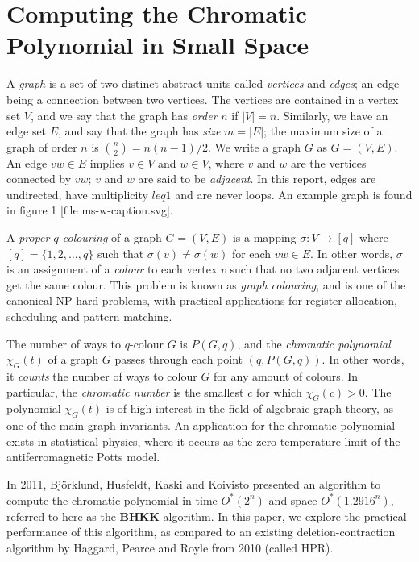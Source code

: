 \documentclass[a4paper]{article}
\begin{document}
 

\section{Computing the Chromatic Polynomial in Small Space}

A \emph{graph} is a set of two distinct abstract units called \emph{vertices} and \emph{edges}; an edge being a connection between two vertices. The vertices are contained in a vertex set $V$, and we say that the graph has \emph{order} $n$ if $|V| = n$. Similarly, we have an edge set $E$, and say that the graph has \emph{size} $m = |E|$; the maximum size of a graph of order $n$ is $\binom{n}{2} = n(n-1)/2$. We write a graph $G$ as $G = (V,E)$. An edge $vw \in E$ implies $v \in V$ and $w \in V$, where $v$ and $w$ are the vertices connected by $vw$; $v$ and $w$ are said to be \emph{adjacent}. In this report, edges are undirected, have multiplicity $leq 1$ and are never loops. An example graph is found in figure 1 [file ms-w-caption.svg].

A \emph{proper $q$-colouring} of a graph $G = (V, E)$ is a mapping $\sigma: V \rightarrow [q]$ where $[q] = \{1,2,\ldots,q\}$ such that $\sigma(v) \neq \sigma(w)$ for each $vw \in E$. In other words, $\sigma$ is an assignment of a \emph{colour} to each vertex $v$ such that no two adjacent vertices get the same colour. This problem is known as \emph{graph colouring}, and is one of the canonical NP-hard problems, with practical applications for register allocation, scheduling and pattern matching. 

The number of ways to $q$-colour $G$ is $P(G,q)$, and the \emph{chromatic polynomial} $\chi_G(t)$ of a graph $G$ passes through each point $(q, P(G,q))$. In other words, it \emph{counts} the number of ways to colour $G$ for any amount of colours.
In particular, the \emph{chromatic number} is the smallest $c$ for which $\chi_G(c) > 0$. The polynomial $\chi_G(t)$ is of high interest in the field of algebraic graph theory, as one of the main graph invariants. An application for the chromatic polynomial exists in statistical physics, where it occurs as the zero-temperature limit of the antiferromagnetic Potts model.

In 2011, Björklund, Husfeldt, Kaski and Koivisto presented an algorithm to compute the chromatic polynomial in time $O^*(2^n)$ and space $O^*(1.2916^n)$, referred to here as the \textbf{BHKK} algorithm. In this paper, we explore the practical performance of this algorithm, as compared to an existing deletion-contraction algorithm by Haggard, Pearce and Royle from 2010 (called HPR).
\end{document}
